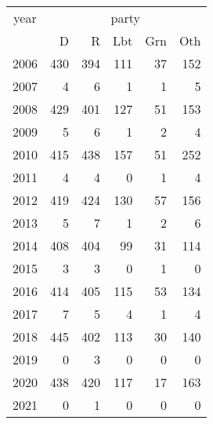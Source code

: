 \footnotesize\begin{tabular}[t]{lrrrrr}
\toprule
\multicolumn{1}{c}{year} & \multicolumn{5}{c}{party} \\
\cmidrule(l{3pt}r{3pt}){1-1} \cmidrule(l{3pt}r{3pt}){2-6}
  & D & R & Lbt & Grn & Oth\\
\midrule
2006 & 430 & 394 & 111 & 37 & 152\\
2007 & 4 & 6 & 1 & 1 & 5\\
2008 & 429 & 401 & 127 & 51 & 153\\
2009 & 5 & 6 & 1 & 2 & 4\\
2010 & 415 & 438 & 157 & 51 & 252\\
2011 & 4 & 4 & 0 & 1 & 4\\
2012 & 419 & 424 & 130 & 57 & 156\\
2013 & 5 & 7 & 1 & 2 & 6\\
2014 & 408 & 404 & 99 & 31 & 114\\
2015 & 3 & 3 & 0 & 1 & 0\\
2016 & 414 & 405 & 115 & 53 & 134\\
2017 & 7 & 5 & 4 & 1 & 4\\
2018 & 445 & 402 & 113 & 30 & 140\\
2019 & 0 & 3 & 0 & 0 & 0\\
2020 & 438 & 420 & 117 & 17 & 163\\
2021 & 0 & 1 & 0 & 0 & 0\\
\bottomrule
\end{tabular}

